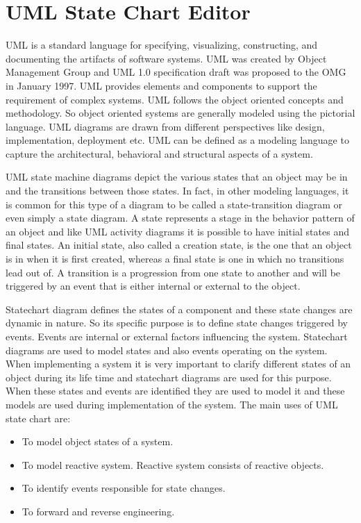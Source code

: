\section{UML State Chart Editor}

UML is a standard language for specifying, visualizing, constructing, and documenting the artifacts of software systems. UML was created by Object Management Group and UML 1.0 specification draft was proposed to the OMG in January 1997. UML provides elements and components to support the requirement of complex systems. UML follows the object oriented concepts and methodology. So object oriented systems are generally modeled using the pictorial language. UML diagrams are drawn from different perspectives like design, implementation, deployment etc. UML can be defined as a modeling language to capture the architectural, behavioral and structural aspects of a system.

UML state machine diagrams depict the various states that an object may be in and the transitions between those states. In fact, in other modeling languages, it is common for this type of a diagram to be called a state-transition diagram or even simply a state diagram. A state represents a stage in the behavior pattern of an object and like UML activity diagrams it is possible to have initial states and final states. An initial state, also called a creation state, is the one that an object is in when it is first created, whereas a final state is one in which no transitions lead out of. A transition is a progression from one state to another and will be triggered by an event that is either internal or external to the object.

Statechart diagram defines the states of a component and these state changes are dynamic in nature. So its specific purpose is to define state changes triggered by events. Events are internal or external factors influencing the system. Statechart diagrams are used to model states and also events operating on the system. When implementing a system it is very important to clarify different states of an object during its life time and statechart diagrams are used for this purpose. When these states and events are identified they are used to model it and these models are used during implementation of the system. The main uses of UML state chart are:
\begin{itemize}
	\item To model object states of a system.
	\item To model reactive system. Reactive system consists of reactive objects.
	\item To identify events responsible for state changes.
	\item To forward and reverse engineering.
\end{itemize}

